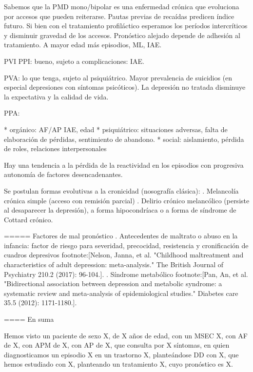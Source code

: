 \documentclass[encares.tex]{subfiles}
\begin{document}
Sabemos que la PMD mono/bipolar es una enfermedad crónica que evoluciona por accesos que pueden reiterarse. Pautas previas de recaídas predicen índice futuro. Si bien con el tratamiento profiláctico esperamos los períodos intercríticos y disminuir gravedad de los accesos. Pronóstico alejado depende de adhesión al tratamiento. A mayor edad más episodios, ML, IAE.

PVI PPI: bueno, sujeto a complicaciones: IAE.

PVA: lo que tenga, sujeto al psiquiátrico. Mayor prevalencia de suicidios (en especial depresiones con síntomas psicóticos). La depresión no tratada disminuye la expectativa y la calidad de vida.

PPA:

* orgánico: AF/AP IAE, edad
* psiquiátrico: situaciones adversas, falta de elaboración de pérdidas, sentimiento de abandono.
* social: aislamiento, pérdida de roles, relaciones interpersonales

Hay una tendencia a la pérdida de la reactividad en los episodios con progresiva autonomía de factores desencadenantes.

Se postulan formas evolutivas a la cronicidad (nosografía clásica):
. Melancolía crónica simple (acceso con remisión parcial)
. Delirio crónico melancólico (persiste al desaparecer la depresión), a forma hipocondríaca o a forma de síndrome de Cottard crónico.

===== Factores de mal pronóstico
. Antecedentes de maltrato o abuso en la infancia: factor de riesgo para severidad, precocidad, resistencia y cronificación de cuadros depresivos footnote:[Nelson, Janna, et al. "Childhood maltreatment and characteristics of adult depression: meta-analysis." The British Journal of Psychiatry 210.2 (2017): 96-104.].
. Síndrome metabólico footnote:[Pan, An, et al. "Bidirectional association between depression and metabolic syndrome: a systematic review and meta-analysis of epidemiological studies." Diabetes care 35.5 (2012): 1171-1180.].

==== En suma

Hemos visto un paciente de sexo X, de X años de edad, con un MSEC X, con AF de X, con APM de X, con AP de X, que consulta por X síntomas, en quien diagnosticamos un episodio X en un trastorno X, planteándose DD con X, que hemos estudiado con X, planteando un tratamiento X, cuyo pronóstico es X.
\end{document}
